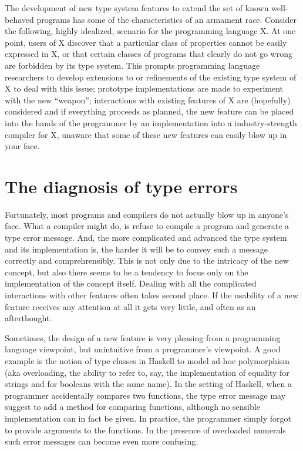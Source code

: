 \documentclass[sigplan,10pt,noacm]{acmart}
\begin{document}
The development of new type system features to extend the set of known
well-behaved programs has some of the characteristics of an armament race.
Consider the following, highly idealized, scenario for the programming
language X.
At one point, users of X discover that a particular class of 
properties cannot be easily expressed in X, or that 
certain classes of programs that
clearly do not go wrong are forbidden by its type system.
This prompts programming language researchers to develop extensions to or
refinements of the existing type system of X to deal with this issue;
prototype implementations are made to experiment with the new ``weapon'';
interactions with existing features of X are (hopefully) considered and
if everything proceeds as planned, the new feature can be placed into the
hands of the programmer by an implementation into a industry-strength compiler
for X, unaware that some of these new features can easily blow up in 
your face.

\section{The diagnosis of type errors}

Fortunately, most programs and compilers do not actually blow up in anyone's 
face. What a compiler might do, is refuse to compile a program and generate a 
type error
message. And, the more complicated and advanced the type system and its
implementation is, the harder it will be to convey such a message
correctly and comprehrensibly. This is not only due to 
the intricacy of the new concept, but also there seems to be a tendency
to focus only on the implementation of the concept itself. 
Dealing with all the complicated interactions with other features often takes
second place. If the usability of a new feature receives any attention at all
it gets very little, and often as an afterthought.

Sometimes, the design
of a new feature is very pleasing from a programming language viewpoint, but
unintuitive from a programmer's viewpoint. A good example is the notion of
type classes in Haskell to model ad-hoc polymorphism (aka overloading, the 
ability to refer to, say, the implementation of equality for strings and for
booleans with the same name). In the setting of Haskell, when 
a programmer accidentally compares two functions, the type error message 
may suggest to add a method for comparing functions, although no sensible
implementation can in fact be given. 
In practice, the programmer simply forgot to provide 
arguments to the functions. In the presence of overloaded numerals such error messages 
can become even more confusing.
\end{document}
